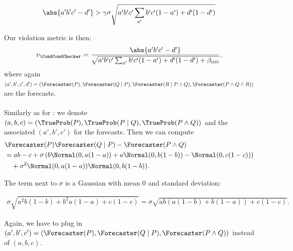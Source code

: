 \begin{align*}
    \abs{a'b'c' - d'}
    > \gamma \sigma \sqrt{ a' b' c' \sum_{a'} b'c' (1-a') + d' (1-d')}
\end{align*}

Our violation metric is then:
\begin{align*}
    v_{\CondCondChecker}
    = \frac{
        \abs{a'b'c' - d'}
        }{
        \sqrt{a'b'c' \sum_{a'} b'c' (1-a') + d' (1-d')+ \betamin}
    }.
\end{align*}
where again $(a', b', c', d') = (\Forecaster(P), \Forecaster(Q \mid P), \Forecaster(R \mid P \wedge Q), \Forecaster(P \wedge Q \wedge R))$ are the forecasts.


\paragraph{\CondChecker}

Similarly as for \CondCondChecker: we denote
$(a, b, c) = \left(\TrueProb(P),  \TrueProb(P \mid Q), \TrueProb(P \wedge Q) \right)$ and the associated $(a', b', c')$ for the forecasts.
Then we can compute
\begin{align*}
    &\Forecaster(P) \Forecaster(Q \mid P) - \Forecaster(P \wedge Q) \\
    &= ab - c + \sigma \left(b \Normal(0, a(1-a)) + a \Normal(0, b(1-b)) - \Normal(0, c(1-c)) \right) \\
    &\quad + \sigma^2 \Normal(0, a(1-a)) \Normal(0, b(1-b)).
\end{align*}




The term next to $\sigma$ is a Gaussian with mean 0 and standard deviation:

\begin{align*}
    \sigma \sqrt{a^2 b(1-b) + b^2 a(1-a) + c(1-c)}
    = \sigma \sqrt{ab \left( a(1-b) + b(1-a) \right) + c(1-c)}.
\end{align*}

Again, we have to plug in $(a', b', c') = (\Forecaster(P), \Forecaster(Q \mid P), \Forecaster(P \wedge Q))$ instead of $(a, b, c)$.

